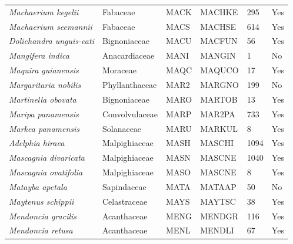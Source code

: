 \documentclass[11pt]{article}
\begin{document}
\begin{longtable}{@{}llllll@{}}
\textit{Machaerium kegelii}                           & Fabaceae         & MACK   & MACHKE & 295             & Yes       \\
\textit{Machaerium seemannii}                         & Fabaceae         & MACS   & MACHSE & 614             & Yes       \\
\textit{Dolichandra unguis-cati}                      & Bignoniaceae     & MACU   & MACFUN & 56              & Yes       \\
\textit{Mangifera indica}                             & Anacardiaceae    & MANI   & MANGIN & 1               & No        \\
\textit{Maquira guianensis}                           & Moraceae         & MAQC   & MAQUCO & 17              & Yes       \\
\textit{Margaritaria nobilis}                         & Phyllanthaceae   & MAR2   & MARGNO & 199             & No        \\
\textit{Martinella obovata}                           & Bignoniaceae     & MARO   & MARTOB & 13              & Yes       \\
\textit{Maripa panamensis}                            & Convolvulaceae   & MARP   & MAR2PA & 733             & Yes       \\
\textit{Markea panamensis}                            & Solanaceae       & MARU   & MARKUL & 8               & Yes       \\
\textit{Adelphia hiraea}                              & Malpighiaceae    & MASH   & MASCHI & 1094            & Yes       \\
\textit{Mascagnia divaricata}                         & Malpighiaceae    & MASN   & MASCNE & 1040            & Yes       \\
\textit{Mascagnia ovatifolia}                         & Malpighiaceae    & MASO   & MASCNE & 8               & Yes       \\
\textit{Matayba apetala}                              & Sapindaceae      & MATA   & MATAAP & 50              & No        \\
\textit{Maytenus schippii}                            & Celastraceae     & MAYS   & MAYTSC & 38              & Yes       \\
\textit{Mendoncia gracilis}                           & Acanthaceae      & MENG   & MENDGR & 116             & Yes       \\
\textit{Mendoncia retusa}                             & Acanthaceae      & MENL   & MENDLI & 67              & Yes       \\

\end{longtable}
\end{document}
